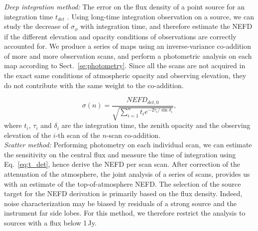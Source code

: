 \noindent \emph{Deep integration method:} The error on the flux density of a
point source for an integration time $t_{det}$ . Using long-time integration observation on a source,
we can study the decrease of $\sigma_\phi$ with integration time, and
therefore estimate the NEFD if the different elevation and opacity conditions of
observations are correctly accounted for.  We produce a series of maps using an
inverse-variance co-addition of more and more observation scans, and perform a
photometric analysis on each map according to Sect.~\ref{se:photometry}. Since
all the scans are not acquired in the exact same conditions of atmospheric
opacity and observing elevation, they do not contribute with the same weight to
the co-addition. 

\begin{equation}
  \sigma(n) = \frac{NEFD_{det,0}}{\sqrt{\sum_{i=1}^{n}t_i e^{-2\tau_i/\sin\delta_i}}},
  \label{eq:sigma_tau_w8}
\end{equation}
where $t_i$, $\tau_i$ and $\delta_i$ are the integration time, the zenith
opacity and the observing elevation of the $i$-th scan of the $n$-scan
co-addition. \\

\noindent \emph{Scatter method:} Performing photometry on each individual scan,
we can estimate the sensitivity on the central flux and measure the time of
integration using Eq.~\ref{eq:t_det}, hence derive the NEFD per scan
scan. After correction of the attenuation of the atmosphere, the joint analysis
of a series of scans,  provides us with
an estimate of the top-of-atmosphere NEFD. The selection of the source target
for the NEFD derivation is primarily based on the flux density. Indeed, noise
characterization may be biased by residuals of a strong source and the
instrument far side lobes. For this method, we therefore restrict the
analysis to sources with a flux below 1\,Jy.

